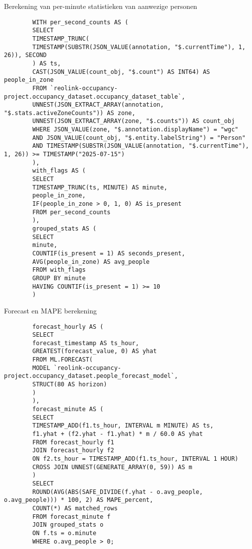 \documentclass[dutch,dit,thesis]{hogentreport}
\begin{document}
\begin{listing}[H]
    \caption{Berekening van per-minute statistieken van aanwezige personen}
    \label{lst:people_per_minute}
    \small
    \begin{verbatim}
        WITH per_second_counts AS (
        SELECT
        TIMESTAMP_TRUNC(
        TIMESTAMP(SUBSTR(JSON_VALUE(annotation, "$.currentTime"), 1, 26)), SECOND
        ) AS ts,
        CAST(JSON_VALUE(count_obj, "$.count") AS INT64) AS people_in_zone
        FROM `reolink-occupancy-project.occupancy_dataset.occupancy_dataset_table`,
        UNNEST(JSON_EXTRACT_ARRAY(annotation, "$.stats.activeZoneCounts")) AS zone,
        UNNEST(JSON_EXTRACT_ARRAY(zone, "$.counts")) AS count_obj
        WHERE JSON_VALUE(zone, "$.annotation.displayName") = "wgc"
        AND JSON_VALUE(count_obj, "$.entity.labelString") = "Person"
        AND TIMESTAMP(SUBSTR(JSON_VALUE(annotation, "$.currentTime"), 1, 26)) >= TIMESTAMP("2025-07-15")
        ),
        with_flags AS (
        SELECT
        TIMESTAMP_TRUNC(ts, MINUTE) AS minute,
        people_in_zone,
        IF(people_in_zone > 0, 1, 0) AS is_present
        FROM per_second_counts
        ),
        grouped_stats AS (
        SELECT
        minute,
        COUNTIF(is_present = 1) AS seconds_present,
        AVG(people_in_zone) AS avg_people
        FROM with_flags
        GROUP BY minute
        HAVING COUNTIF(is_present = 1) >= 10
        )
    \end{verbatim}
\end{listing}

\begin{listing}[H]
    \caption{Forecast en MAPE berekening}
    \label{lst:people_forecast_mape}
    \small
    \begin{verbatim}
        forecast_hourly AS (
        SELECT
        forecast_timestamp AS ts_hour,
        GREATEST(forecast_value, 0) AS yhat
        FROM ML.FORECAST(
        MODEL `reolink-occupancy-project.occupancy_dataset.people_forecast_model`,
        STRUCT(80 AS horizon)
        )
        ),
        forecast_minute AS (
        SELECT
        TIMESTAMP_ADD(f1.ts_hour, INTERVAL m MINUTE) AS ts,
        f1.yhat + (f2.yhat - f1.yhat) * m / 60.0 AS yhat
        FROM forecast_hourly f1
        JOIN forecast_hourly f2
        ON f2.ts_hour = TIMESTAMP_ADD(f1.ts_hour, INTERVAL 1 HOUR)
        CROSS JOIN UNNEST(GENERATE_ARRAY(0, 59)) AS m
        )
        SELECT
        ROUND(AVG(ABS(SAFE_DIVIDE(f.yhat - o.avg_people, o.avg_people))) * 100, 2) AS MAPE_percent,
        COUNT(*) AS matched_rows
        FROM forecast_minute f
        JOIN grouped_stats o
        ON f.ts = o.minute
        WHERE o.avg_people > 0;
    \end{verbatim}
\end{listing}
\end{document}
